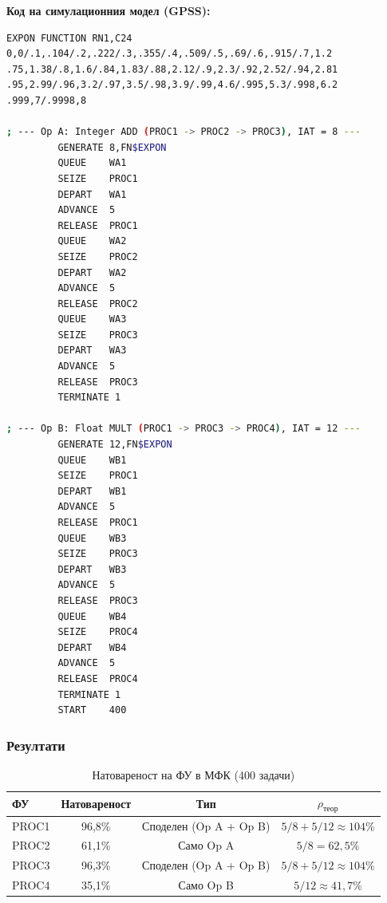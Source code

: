 \textbf{Код на симулационния модел (GPSS):}
\begin{lstlisting}[language=bash]
EXPON FUNCTION RN1,C24
0,0/.1,.104/.2,.222/.3,.355/.4,.509/.5,.69/.6,.915/.7,1.2
.75,1.38/.8,1.6/.84,1.83/.88,2.12/.9,2.3/.92,2.52/.94,2.81
.95,2.99/.96,3.2/.97,3.5/.98,3.9/.99,4.6/.995,5.3/.998,6.2
.999,7/.9998,8

; --- Op A: Integer ADD (PROC1 -> PROC2 -> PROC3), IAT = 8 ---
         GENERATE 8,FN$EXPON
         QUEUE    WA1
         SEIZE    PROC1
         DEPART   WA1
         ADVANCE  5
         RELEASE  PROC1
         QUEUE    WA2
         SEIZE    PROC2
         DEPART   WA2
         ADVANCE  5
         RELEASE  PROC2
         QUEUE    WA3
         SEIZE    PROC3
         DEPART   WA3
         ADVANCE  5
         RELEASE  PROC3
         TERMINATE 1

; --- Op B: Float MULT (PROC1 -> PROC3 -> PROC4), IAT = 12 ---
         GENERATE 12,FN$EXPON
         QUEUE    WB1
         SEIZE    PROC1
         DEPART   WB1
         ADVANCE  5
         RELEASE  PROC1
         QUEUE    WB3
         SEIZE    PROC3
         DEPART   WB3
         ADVANCE  5
         RELEASE  PROC3
         QUEUE    WB4
         SEIZE    PROC4
         DEPART   WB4
         ADVANCE  5
         RELEASE  PROC4
         TERMINATE 1
         START    400
\end{lstlisting}

\subsubsection{Резултати}

\begin{table}[H]
    \centering
    \caption{Натовареност на ФУ в МФК (400 задачи)}
    \begin{tabular}{|l|c|c|c|}
        \hline
        \textbf{ФУ} & \textbf{Натовареност} & \textbf{Тип} & \textbf{$\rho_\mathrm{теор}$} \\
        \hline
        PROC1 & 96{,}8\% & Споделен (Op A + Op B) & $5/8 + 5/12 \approx 104\%$ \\
        \hline
        PROC2 & 61{,}1\% & Само Op A              & $5/8 = 62{,}5\%$           \\
        \hline
        PROC3 & 96{,}3\% & Споделен (Op A + Op B) & $5/8 + 5/12 \approx 104\%$ \\
        \hline
        PROC4 & 35{,}1\% & Само Op B              & $5/12 \approx 41{,}7\%$    \\
        \hline
    \end{tabular}
\end{table}

